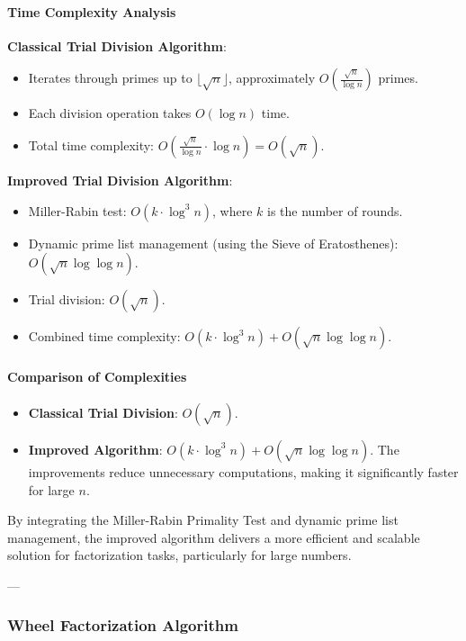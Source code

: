 \documentclass[12pt]{report}
\begin{document}
\paragraph{Time Complexity Analysis}

\textbf{Classical Trial Division Algorithm}:
\begin{itemize}
    \item Iterates through primes up to $\lfloor \sqrt{n} \rfloor$, approximately $O(\frac{\sqrt{n}}{\log n})$ primes.
    \item Each division operation takes $O(\log n)$ time.
    \item Total time complexity: $O(\frac{\sqrt{n}}{\log n} \cdot \log n) = O(\sqrt{n})$.
\end{itemize}

\textbf{Improved Trial Division Algorithm}:
\begin{itemize}
    \item Miller-Rabin test: $O(k \cdot \log^3 n)$, where $k$ is the number of rounds.
    \item Dynamic prime list management (using the Sieve of Eratosthenes): $O(\sqrt{n} \log \log n)$.
    \item Trial division: $O(\sqrt{n})$.
    \item Combined time complexity: $O(k \cdot \log^3 n) + O(\sqrt{n} \log \log n)$.
\end{itemize}

\paragraph{Comparison of Complexities}
\begin{itemize}
    \item \textbf{Classical Trial Division}: $O(\sqrt{n})$.
    \item \textbf{Improved Algorithm}: $O(k \cdot \log^3 n) + O(\sqrt{n} \log \log n)$. The improvements reduce unnecessary computations, making it significantly faster for large $n$.
\end{itemize}

By integrating the Miller-Rabin Primality Test and dynamic prime list management, the improved algorithm delivers a more efficient and scalable solution for factorization tasks, particularly for large numbers.

---

\subsubsection{Wheel Factorization Algorithm}
\end{document}
